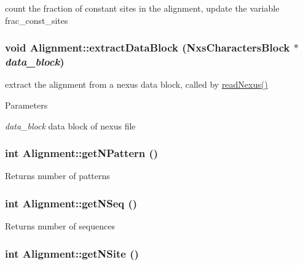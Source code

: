 \label{classAlignment_aa9a60448e5e8ac12bbf30557dfaf9018}
count the fraction of constant sites in the alignment, update the variable frac\_\-const\_\-sites \hypertarget{classAlignment_abb4dfacef5d00ca51f214e21dfae2df3}{
\subsubsection[{extractDataBlock}]{\setlength{\rightskip}{0pt plus 5cm}void Alignment::extractDataBlock ({\bf NxsCharactersBlock} $\ast$ {\em data\_\-block})}}
\label{classAlignment_abb4dfacef5d00ca51f214e21dfae2df3}
extract the alignment from a nexus data block, called by \hyperlink{classAlignment_a50c61ad1efb041f9e0039d5293646b15}{readNexus()} 
\begin{DoxyParams}{Parameters}
\item[{\em data\_\-block}]data block of nexus file \end{DoxyParams}
\hypertarget{classAlignment_ab070fcbe981bdc38800a79066c770ddc}{
\subsubsection[{getNPattern}]{\setlength{\rightskip}{0pt plus 5cm}int Alignment::getNPattern ()}}
\label{classAlignment_ab070fcbe981bdc38800a79066c770ddc}
\begin{DoxyReturn}{Returns}
number of patterns 
\end{DoxyReturn}
\hypertarget{classAlignment_ab897ce9c1a93577daa9934e906f7d6cd}{
\subsubsection[{getNSeq}]{\setlength{\rightskip}{0pt plus 5cm}int Alignment::getNSeq ()}}
\label{classAlignment_ab897ce9c1a93577daa9934e906f7d6cd}
\begin{DoxyReturn}{Returns}
number of sequences 
\end{DoxyReturn}
\hypertarget{classAlignment_a218c888333e7e7d35c44c3b554cf5716}{
\subsubsection[{getNSite}]{\setlength{\rightskip}{0pt plus 5cm}int Alignment::getNSite ()}}
